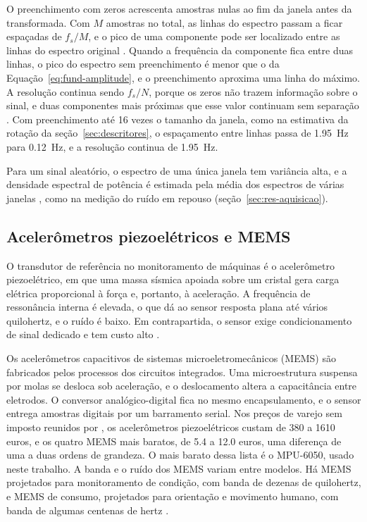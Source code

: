 O preenchimento com zeros acrescenta amostras nulas ao fim da janela antes da transformada. Com $M$ amostras no total, as linhas do espectro passam a ficar espaçadas de $f_s/M$, e o pico de uma componente pode ser localizado entre as linhas do espectro original \cite{brandt2011}. Quando a frequência da componente fica entre duas linhas, o pico do espectro sem preenchimento é menor que o da Equação~\eqref{eq:fund-amplitude}, e o preenchimento aproxima uma linha do máximo. A resolução continua sendo $f_s/N$, porque os zeros não trazem informação sobre o sinal, e duas componentes mais próximas que esse valor continuam sem separação \cite{brandt2011}. Com preenchimento até \num{16} vezes o tamanho da janela, como na estimativa da rotação da seção~\ref{sec:descritores}, o espaçamento entre linhas passa de \SI{1,95}{\hertz} para \SI{0,12}{\hertz}, e a resolução continua de \SI{1,95}{\hertz}.

Para um sinal aleatório, o espectro de uma única janela tem variância alta, e a densidade espectral de potência é estimada pela média dos espectros de várias janelas \cite{brandt2011}, como na medição do ruído em repouso (seção~\ref{sec:res-aquisicao}).

\subsection{Acelerômetros piezoelétricos e MEMS}\label{sec:fund-mems}

O transdutor de referência no monitoramento de máquinas é o acelerômetro piezoelétrico, em que uma massa sísmica apoiada sobre um cristal gera carga elétrica proporcional à força e, portanto, à aceleração. A frequência de ressonância interna é elevada, o que dá ao sensor resposta plana até vários quilohertz, e o ruído é baixo. Em contrapartida, o sensor exige condicionamento de sinal dedicado e tem custo alto \cite{albarbar2008}.

Os acelerômetros capacitivos de sistemas microeletromecânicos (MEMS) são fabricados pelos processos dos circuitos integrados. Uma microestrutura suspensa por molas se desloca sob aceleração, e o deslocamento altera a capacitância entre eletrodos. O conversor analógico-digital fica no mesmo encapsulamento, e o sensor entrega amostras digitais por um barramento serial. Nos preços de varejo sem imposto reunidos por , os acelerômetros piezoelétricos custam de \num{380} a \num{1610} euros, e os quatro MEMS mais baratos, de \num{5,4} a \num{12,0} euros, uma diferença de uma a duas ordens de grandeza. O mais barato dessa lista é o MPU-6050, usado neste trabalho. A banda e o ruído dos MEMS variam entre modelos. Há MEMS projetados para monitoramento de condição, com banda de dezenas de quilohertz, e MEMS de consumo, projetados para orientação e movimento humano, com banda de algumas centenas de hertz \cite{albarbar2008,fidali2024}.

